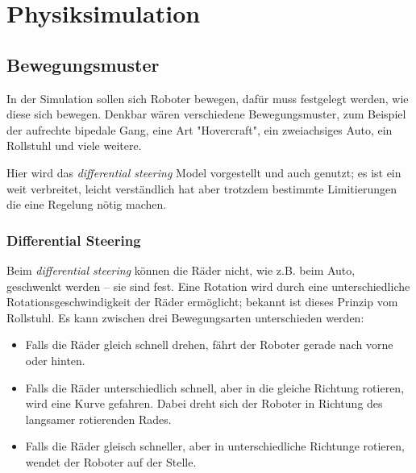 \clearpage
\section{Physiksimulation}

\subsection{Bewegungsmuster}
In der Simulation sollen sich Roboter bewegen, daf{\"{u}}r muss festgelegt werden, wie diese sich bewegen. Denkbar w{\"{a}}ren verschiedene Bewegungsmuster, zum
Beispiel der aufrechte bipedale Gang, eine Art "Hovercraft", ein zweiachsiges Auto, ein Rollstuhl und viele weitere.

Hier wird das \textit{differential steering} Model vorgestellt und auch genutzt; es ist ein weit verbreitet, leicht verst{\"{a}}ndlich hat aber trotzdem bestimmte
Limitierungen die eine Regelung n{\"{o}}tig machen.

\subsubsection{Differential Steering}\label{diffs}
Beim \textit{differential steering} k{\"{o}}nnen die R{\"{a}}der nicht, wie z.B. beim Auto, geschwenkt werden -- sie sind fest. Eine Rotation wird durch eine unterschiedliche Rotationsgeschwindigkeit der R{\"{a}}der
erm{\"{o}}glicht; bekannt ist dieses Prinzip vom Rollstuhl. Es kann zwischen drei Bewegungsarten unterschieden werden:
\begin{itemize}
\item Falls die R{\"{a}}der gleich schnell drehen, f{\"{a}}hrt der Roboter gerade nach vorne oder hinten.
\item Falls die R{\"{a}}der unterschiedlich schnell, aber in die gleiche Richtung rotieren, wird eine Kurve gefahren. Dabei dreht sich der Roboter in Richtung des langsamer rotierenden Rades.
\item Falls die R{\"{a}}der gleisch schneller, aber in unterschiedliche Richtunge rotieren, wendet der Roboter auf der Stelle.
\end{itemize}

